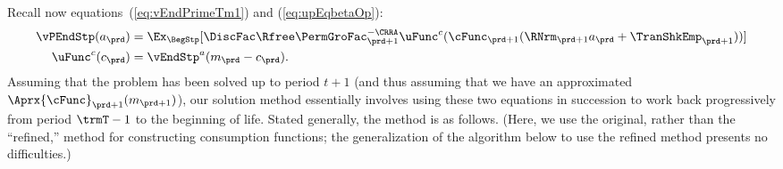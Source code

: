 Recall now equations~(\ref{eq:vEndPrimeTm1}) and (\ref{eq:upEqbetaOp}):
\begin{equation*}\begin{gathered}\begin{aligned}
      \vPEndStp(a_{\prd})  & = \Ex_{\BegStp}[\DiscFac \Rfree \PermGroFac_{\prd+1}^{-\CRRA}
      \uFunc^{c}(\cFunc_{\prd+1}(\RNrm_{\prd+1} a_{\prd}+{\TranShkEmp}_{\prd+1}))]
      \\\uFunc^{c}(c_{\prd})   & = \vEndStp^{a}(m_{\prd}-c_{\prd}).
    \end{aligned}\end{gathered}\end{equation*}
Assuming that the problem has been solved up to period $t+1$ (and thus assuming that we have an approximated $\Aprx{\cFunc}_{\prd+1}(m_{\prd+1})$), our solution method essentially involves using these two equations in succession to work back progressively from period $\trmT-1$ to the beginning of life.  Stated generally, the method is as follows.  (Here, we use the original, rather than the ``refined,'' method for constructing consumption functions; the generalization of the algorithm below to use the refined method presents no difficulties.)

